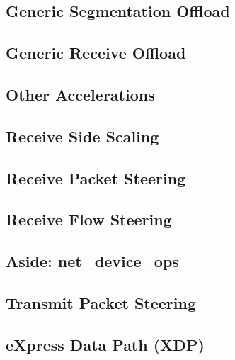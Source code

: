 \subsection{Generic Segmentation Offload}

\subsection{Generic Receive Offload}

\subsection{Other Accelerations}

\subsection{Receive Side Scaling}

\subsection{Receive Packet Steering}

\subsection{Receive Flow Steering}

\subsection{Aside: net\_device\_ops}

\subsection{Transmit Packet Steering}

\subsection{eXpress Data Path (XDP)}


